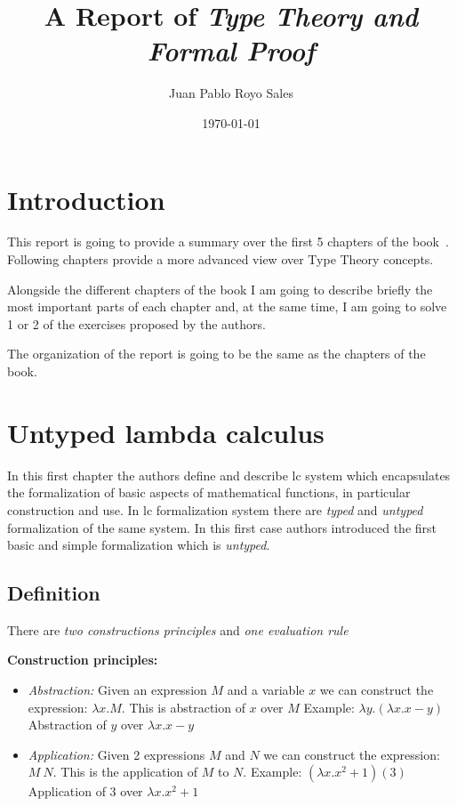 \documentclass[12pt, a4paper]{article}
\title{%
      A Report of \textit{Type Theory and Formal Proof}
}
\author{Juan Pablo Royo Sales}
\affil{Universitat Politècnica de Catalunya}
\date\today
\begin{document}
\maketitle

\tableofcontents

\section{Introduction}
This report is going to provide a summary over the first 5 chapters of the book~\cite{type_theory}. Following chapters provide a more advanced view over Type Theory concepts.

Alongside the different chapters of the book I am going to describe briefly the most important parts of each chapter and, at the same time,
I am going to solve 1 or 2 of the exercises proposed by the authors.

The organization of the report is going to be the same as the chapters of the book.

\section{Untyped lambda calculus}
In this first chapter the authors define and describe \acrfull{lc} system which encapsulates the formalization of basic aspects
of mathematical functions, in particular construction and use. In \acrshort{lc} formalization system there are \textit{typed} and \textit{untyped} 
formalization of the same system. In this first case authors introduced the first basic and simple formalization which is \textit{untyped}.

\subsection{Definition}
There are \textit{two constructions principles} and \textit{one evaluation rule}

\textbf{Construction principles:}

\begin{itemize}
    \item \textit{Abstraction:} Given an expression $M$ and a variable $x$ we can construct the expression: $\lambda x.M$. This is abstraction of $x$ over $M$
    Example: $\lambda y.(\lambda x. x - y)$ Abstraction of $y$ over $\lambda x. x - y$
    \item \textit{Application:} Given 2 expressions $M$ and $N$ we can construct the expression: $M\ N$. This is the application of $M$ to $N$.
    Example: $(\lambda x.x^2 + 1)(3)$ Application of $3$ over $\lambda x.x^2 + 1$
\end{itemize}
\end{document}
